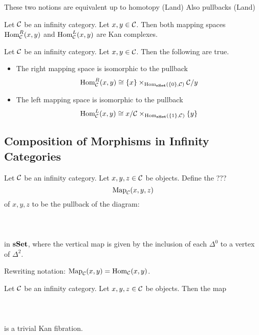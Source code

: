 \documentclass[a4paper]{article}
\begin{document}
These two notions are equivalent up to homotopy (Land) Also pullbacks (Land)

\begin{prp}{}{} Let $\mathcal{C}$ be an infinity category. Let $x,y\in\mathcal{C}$. Then both mapping spaces $\operatorname{Hom}_{\mathcal{C}}^R(x,y)$ and $\operatorname{Hom}_{\mathcal{C}}^L(x,y)$ are Kan complexes. 
\end{prp}

\begin{prp}{}{} Let $\mathcal{C}$ be an infinity category. Let $x,y\in\mathcal{C}$. Then the following are true. 
\begin{itemize}
\item The right mapping space is isomorphic to the pullback $$\operatorname{Hom}_{\mathcal{C}}^R(x,y)\cong\{x\}\times_{\operatorname{Hom}_\bold{sSet}(\{0\},\mathcal{C})}\mathcal{C}/y$$
\item The left mapping space is isomorphic to the pullback $$\operatorname{Hom}_{\mathcal{C}}^L(x,y)\cong x/\mathcal{C}\times_{\operatorname{Hom}_\bold{sSet}(\{1\},\mathcal{C})}\{y\}$$
\end{itemize}
\end{prp}

\subsection{Composition of Morphisms in Infinity Categories}
\begin{defn}{}{} Let $\mathcal{C}$ be an infinity category. Let $x,y,z\in\mathcal{C}$ be objects. Define the ??? $$\text{Map}_{\mathcal{C}}(x,y,z)$$ of $x,y,z$ to be the pullback of the diagram: \\~\\
\\~\\
in $\bold{sSet}$, where the vertical map is given by the inclusion of each $\Delta^0$ to a vertex of $\Delta^2$. 
\end{defn}

Rewriting notation: $\text{Map}_{\mathcal{C}}(x,y)=\operatorname{Hom}_{\mathcal{C}}(x,y)$. 

\begin{lmm}{}{} Let $\mathcal{C}$ be an infinity category. Let $x,y,z\in\mathcal{C}$ be objects. Then the map \\~\\
\\~\\
is a trivial Kan fibration. 
\end{lmm}
\end{document}
